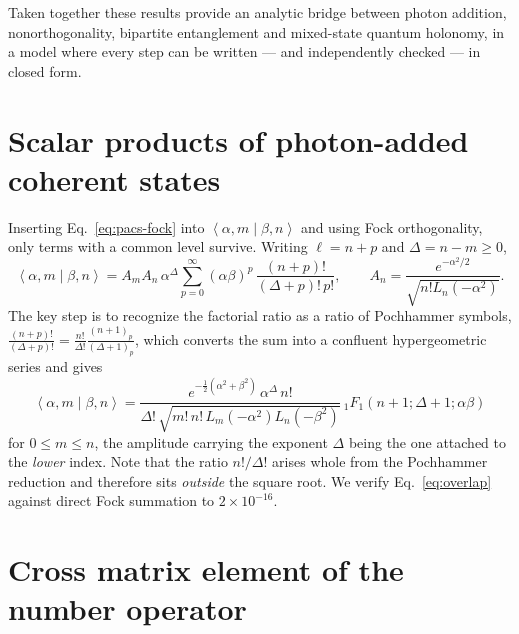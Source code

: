 \documentclass[11pt]{article}
\newcommand{\braket}[2]{\left\langle#1\middle|#2\right\rangle}
\newcommand{\hyp}[3]{{}_1F_1\!\left(#1;#2;#3\right)}
\begin{document}
Taken together these results provide an analytic bridge between photon
addition, nonorthogonality, bipartite entanglement and mixed-state quantum
holonomy, in a model where every step can be written --- and independently
checked --- in closed form.

\appendix
\section{Scalar products of photon-added coherent states}
\label{app:overlaps}

Inserting Eq.~\eqref{eq:pacs-fock} into $\braket{\alpha,m}{\beta,n}$ and using
Fock orthogonality, only terms with a common level survive. Writing
$\ell=n+p$ and $\Delta=n-m\ge0$,
\begin{equation}
\braket{\alpha,m}{\beta,n}=A_mA_n\,\alpha^{\Delta}
\sum_{p=0}^{\infty}(\alpha\beta)^{p}\,\frac{(n+p)!}{(\Delta+p)!\,p!},
\qquad A_n=\frac{e^{-\alpha^2/2}}{\sqrt{n!L_n(-\alpha^2)}} .
\end{equation}
The key step is to recognize the factorial ratio as a ratio of Pochhammer
symbols,
$\frac{(n+p)!}{(\Delta+p)!}=\frac{n!}{\Delta!}\frac{(n+1)_p}{(\Delta+1)_p}$,
which converts the sum into a confluent hypergeometric series and gives
\begin{equation}
\boxed{\;\braket{\alpha,m}{\beta,n}=
\frac{e^{-\frac12(\alpha^2+\beta^2)}\,\alpha^{\Delta}\,n!}
{\Delta!\,\sqrt{m!\,n!\,L_m(-\alpha^2)L_n(-\beta^2)}}\,
\hyp{n+1}{\Delta+1}{\alpha\beta}\;}
\label{eq:overlap}
\end{equation}
for $0\le m\le n$, the amplitude carrying the exponent $\Delta$ being the one
attached to the \emph{lower} index. Note that the ratio $n!/\Delta!$ arises
whole from the Pochhammer reduction and therefore sits \emph{outside} the
square root. We verify Eq.~\eqref{eq:overlap} against direct Fock summation to
$2\times10^{-16}$.

\section{Cross matrix element of the number operator}
\label{app:cross}
\end{document}
